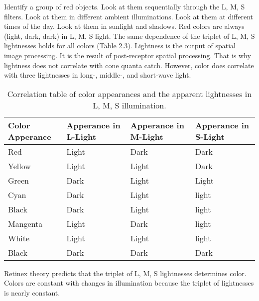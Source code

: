 Identify a group of red objects. Look at them sequentially through the L, M, S filters. Look at them in different ambient illuminations. Look at them at different times of the day. Look at them in sunlight and shadows. Red colors are always (light, dark, dark) in L, M, S light. The same dependence of the triplet of L, M, S lightnesses holds for all colors (Table 2.3). Lightness is the output of spatial image processing. It is the result of post-receptor spatial processing. That is why lightness does not correlate with cone quanta catch. However, color does correlate with three lightnesses in long-, middle-, and short-wave light.


\begin{table}[h!]
	\begin{center}
	\caption{Correlation table of color appearances and the apparent lightnesses in L, M, 		S illumination.}
    \label{tab:table1}
	\begin{tabular}{| m{3cm} | m{3cm}|m{3cm}|m{3cm}| }
	\hline
		\textbf{Color Apperance} & \textbf{Apperance in L-Light} & \textbf{Apperance in M-Light} & \textbf{Apperance in S-Light}\\
	\hline
		Red & Light & Dark & Dark \\
	\hline
		Yellow & Light & Light & Dark \\ 
	
	\hline
		Green & Dark & Light & Light \\ 
	
	\hline
		Cyan & Dark & Light & light \\ 
	
	\hline
		Black & Dark & Light & light \\ 
	
	\hline
		Mangenta & Light & Dark & light \\ 
	
	\hline
		White & Light & Light & light \\ 
	\hline
		Black & Dark & Dark & Dark \\ 
	
	\hline
	\end{tabular}
	\end{center}

\end{table}

Retinex theory predicts that the triplet of L, M, S lightnesses determines color. Colors are constant with changes in illumination because the triplet of lightnesses is nearly constant.

